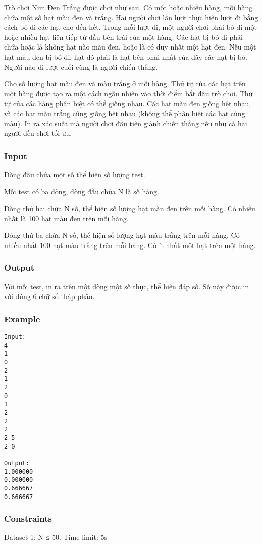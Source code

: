 



   Trò chơi Nim Đen Trắng được chơi như sau. Có một hoặc nhiều hàng, mỗi hàng chứa một số hạt màu đen và trắng. Hai người chơi lần lượt thực hiện lượt đi bằng cách bỏ đi các hạt cho đến hết. Trong mỗi lượt đi, một người chơi phải bỏ đi một hoặc nhiều hạt liên tiếp từ đầu bên trái của một hàng. Các hạt bị bỏ đi phải chứa hoặc là không hạt nào màu đen, hoặc là có duy nhất một hạt đen. Nếu một hạt màu đen bị bỏ đi, hạt đó phải là hạt bên phải nhất của dãy các hạt bị bỏ. Người nào đi lượt cuối cùng là người chiến thắng.  

   Cho số lượng hạt màu đen và màu trắng ở mỗi hàng. Thứ tự của các hạt trên một hàng được tạo ra một cách ngẫu nhiên vào thời điểm bắt đầu trò chơi. Thứ tự của các hàng phân biệt có thể giống nhau. Các hạt màu đen giống hệt nhau, và các hạt màu trắng cũng giống hệt nhau (không thể phân biệt các hạt cùng màu). In ra xác suất mà người chơi đầu tiên giành chiến thắng nếu như cả hai người đều chơi tối ưu.  

\subsubsection{   Input  }

   Dòng đầu chứa một số thể hiện số lượng test.  

   Mỗi test có ba dòng, dòng đầu chứa N là số hàng.  

   Dòng thứ hai chứa N số, thể hiện số lượng hạt màu đen trên mỗi hàng. Có nhiều nhất là 100 hạt màu đen trên mỗi hàng.  

   Dòng thứ ba chứa N số, thể hiện số lượng hạt màu trắng trên mỗi hàng. Có nhiều nhất 100 hạt màu trắng trên mỗi hàng. Có ít nhất một hạt trên một hàng.  

\subsubsection{   Output  }

   Với mỗi test, in ra trên một dòng một số thực, thể hiện đáp số. Số này được in với đúng 6 chữ số thập phân.  

\subsubsection{   Example  }
\begin{verbatim}
Input:
4
1
0
2
1
2
0
1
2
2
2
2 5
2 0

Output:
1.000000
0.000000
0.666667
0.666667
\end{verbatim}

\subsubsection{   Constraints  }

   Dataset 1: N ≤ 50. Time limit: 5s  